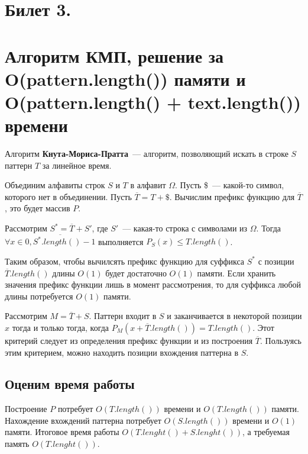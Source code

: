 \section{Билет 3.}
\section*{Алгоритм КМП, решение за O(pattern.length()) памяти и O(pattern.length() + text.length()) времени}
\par
Алгоритм \textbf{Кнута-Мориса-Пратта}~--- алгоритм, позволяющий
искать в строке $S$ паттерн $T$ за линейное время.

Объединим алфавиты строк $S$ и $T$ в алфавит $\Omega$. Пусть \$~--- 
какой-то символ, которого нет в объединении. Пусть $\overline{T} = T + \$$.
Вычислим префикс функцию для $\overline{T}$, это будет
массив $P$.
\par
Рассмотрим $S^* = \overline{T} + S'$, где $S'$~--- какая-то строка
с символами из $\Omega$. Тогда $\forall x \in \overline{0, S^*.length() - 1}$ выполняется $ 
P_S(x) \leq T.length()$.
\par
Таким образом, чтобы вычилсять префикс функцию для суффикса $S^*$ с позиции
$\overline{T}.length()$ длины $O(1)$ будет достаточно $O(1)$ памяти. Если
хранить значения префикс функции лишь в момент рассмотрения, то для суффикса
любой длины потребуется $O(1)$ памяти.
\par
Рассмотрим $M = \overline{T} + S$. Паттерн входит в $S$ и заканчивается
в некоторой позиции $x$ тогда и только тогда, когда $P_M(x + \overline{T}.length()) = T.length()$.
Этот критерий следует из определения префикс функции и из построения $\overline{T}$.
Пользуясь этим критерием, можно находить позиции вхождения паттерна в $S$.

\subsection*{Оценим время работы}

Построение $P$ потребует $O(T.length())$ времени и $O(T.length())$ памяти.
Нахождение вхождений паттерна потребует $O(S.length())$ времени и $O(1)$ памяти.
Итоговое время работы $O(T.lenght() + S.lenght())$, а требуемая память
$O(T.lenght())$.